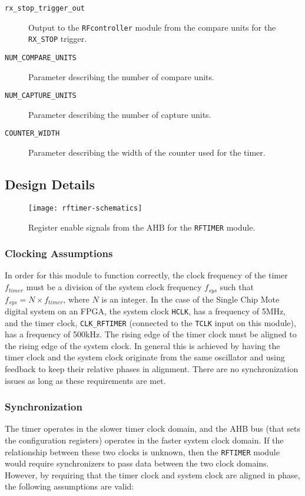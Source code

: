\begin{description}
	\item[\texttt{rx\_stop\_trigger\_out}] Output to the \texttt{RFcontroller} module from the compare units for the \texttt{RX\_STOP} trigger.
	\item[\texttt{NUM\_COMPARE\_UNITS}] Parameter describing the number of compare units.
	\item[\texttt{NUM\_CAPTURE\_UNITS}] Parameter describing the number of capture units.
	\item[\texttt{COUNTER\_WIDTH}] Parameter describing the width of the counter used for the timer.
\end{description}

\subsection{Design Details}

\begin{figure}
\centering
\texttt{[image: rftimer-schematics]}
\caption{Register enable signals from the AHB for the \texttt{RFTIMER} module.}
\label{fig:rftimer-wr-en}
\end{figure}

\subsubsection{Clocking Assumptions}
In order for this module to function correctly, the clock frequency of the timer $f_{timer}$ must be a division of the system clock frequency $f_{sys}$ such that $f_{sys} = N \times f_{timer}$, where $N$ is an integer. In the case of the Single Chip Mote digital system on an FPGA, the system clock \texttt{HCLK}, has a frequency of 5MHz, and the timer clock, \texttt{CLK\_RFTIMER} (connected to the \texttt{TCLK} input on this module), has a frequency of 500kHz. The rising edge of the timer clock must be aligned to the rising edge of the system clock. In general this is achieved by having the timer clock and the system clock originate from the same oscillator and using feedback to keep their relative phases in alignment. There are no synchronization issues as long as these requirements are met.

\subsubsection{Synchronization}
The timer operates in the slower timer clock domain, and the AHB bus (that sets the configuration registers) operates in the faster system clock domain. If the relationship between these two clocks is unknown, then the \texttt{RFTIMER} module would require synchronizers to pass data between the two clock domains. However, by requiring that the timer clock and system clock are aligned in phase, the following assumptions are valid:

